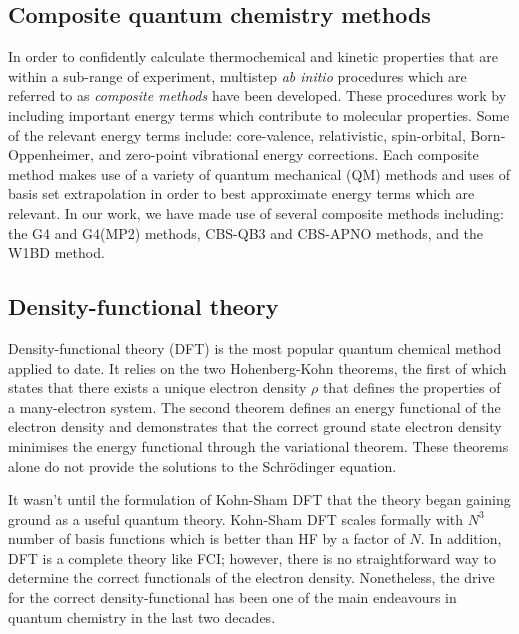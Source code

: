 \subsection{Composite quantum chemistry methods}

In order to confidently calculate thermochemical and kinetic properties that are
within a sub-\kcalmol range of experiment, multistep \emph{ab initio} procedures
which are referred to as \emph{composite methods} have been
developed.\cite{Karton2016} These procedures work by including important energy
terms which contribute to molecular properties. Some of the relevant energy
terms include: core-valence, relativistic, spin-orbital, Born-Oppenheimer, and
zero-point vibrational energy corrections. Each composite method makes use of a
variety of quantum mechanical (QM) methods and uses of basis set extrapolation in
order to best approximate energy terms which are relevant. In our work, we have
made use of several composite methods including: the G4 and G4(MP2)
methods,\cite{Curtiss2007,Curtiss2007a} CBS-QB3 and CBS-APNO
methods,\cite{Montgomery1999,Montgomery2000,Ochterski1996} and the W1BD
method.\cite{Barnes2009}


\subsection{Density-functional theory}

Density-functional theory (DFT) is the most popular quantum chemical method
applied to date. It relies on the two Hohenberg-Kohn theorems, the first of
which states that there exists a unique electron density $\rho$ that defines the
properties of a many-electron system. The second theorem defines an energy
functional of the electron density and demonstrates that the correct ground
state electron density minimises the energy functional through the variational
theorem.\cite{Hohenberg1964,Koch2000} These theorems alone do not provide the
solutions to the Schr{\"o}dinger equation.

It wasn't until the formulation of Kohn-Sham DFT\cite{Kohn1965} that the theory
began gaining ground as a useful quantum theory. Kohn-Sham DFT scales formally
with $N^3$ number of basis functions\cite{Cramer2004} which is better than HF by
a factor of $N$. In addition, DFT is a complete theory like FCI; however, there
is no straightforward way to determine the correct functionals of the electron
density. Nonetheless, the drive for the correct density-functional has been one
of the main endeavours in quantum chemistry in the last two decades.

